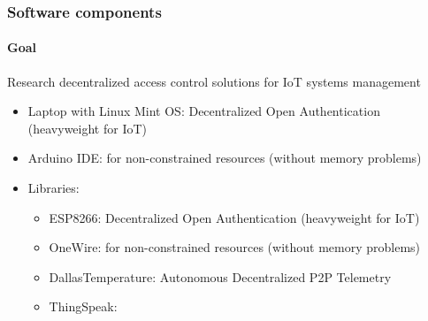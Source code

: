 \documentclass[
    aspectratio=169,                   %
]{beamer}
\begin{document}
    \begin{frame}
        \frametitle{Software components}

        \paragraph{Goal} Research decentralized access control solutions for IoT systems management

        \begin{itemize}
            \item \alert{Laptop with Linux Mint OS}: Decentralized Open Authentication (heavyweight for IoT)
            \item \alert{Arduino IDE\cite{arduinoide}}: for non-constrained resources (without memory problems)

            \item \alert{Libraries:}
            \begin{itemize}
                \item \alert{ESP8266}: Decentralized Open Authentication (heavyweight for IoT)
                \item \alert{OneWire}: for non-constrained resources (without memory problems)
                \item \alert{DallasTemperature}: Autonomous Decentralized P2P Telemetry   
                \item \alert{ThingSpeak}:      
            \end{itemize}
        \end{itemize}

    \end{frame}
\end{document}
